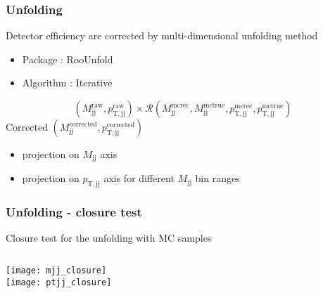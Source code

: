 \begin{frame}

\frametitle{Unfolding}
Detector efficiency are corrected by multi-dimensional unfolding method
\begin{itemize}
\item{Package : RooUnfold}
\item{Algorithm : Iterative}
\end{itemize}

	\begin{equation}
	(M_\mathrm{jj}^\mathrm{raw},p_\mathrm{T,jj}^\mathrm{raw}) \times \mathcal{R} (M_\mathrm{jj}^\mathrm{mcrec},M_\mathrm{jj}^\mathrm{mctrue},p_\mathrm{T,jj}^\mathrm{mcrec},p_\mathrm{T,jj}^\mathrm{mctrue})
	\end{equation}
Corrected $(M_\mathrm{jj}^\mathrm{corrected},p_\mathrm{T,jj}^\mathrm{corrected})$ 
\begin{itemize}
\item{projection on $M_\mathrm{jj}$ axis}
\item{projection on $p_\mathrm{T,jj}$ axis for different $M_\mathrm{jj}$ bin ranges}
\end{itemize}	

\end{frame}

\begin{frame}
\frametitle{Unfolding - closure test}
Closure test for the unfolding with MC samples
\begin{columns}[t]
\centering
\texttt{[image: mjj\_closure]}\\
\texttt{[image: ptjj\_closure]}\\
\end{columns}
\end{frame}




















